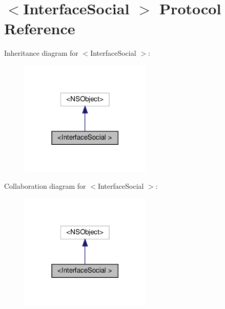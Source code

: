 \hypertarget{protocolInterfaceSocial_01-p}{}\section{$<$Interface\+Social $>$ Protocol Reference}
\label{protocolInterfaceSocial_01-p}


Inheritance diagram for $<$Interface\+Social $>$\+:
\nopagebreak
\begin{figure}[H]
\begin{center}
\leavevmode
\includegraphics[width=177pt]{protocolInterfaceSocial_01-p__inherit__graph}
\end{center}
\end{figure}


Collaboration diagram for $<$Interface\+Social $>$\+:
\nopagebreak
\begin{figure}[H]
\begin{center}
\leavevmode
\includegraphics[width=177pt]{protocolInterfaceSocial_01-p__coll__graph}
\end{center}
\end{figure}
